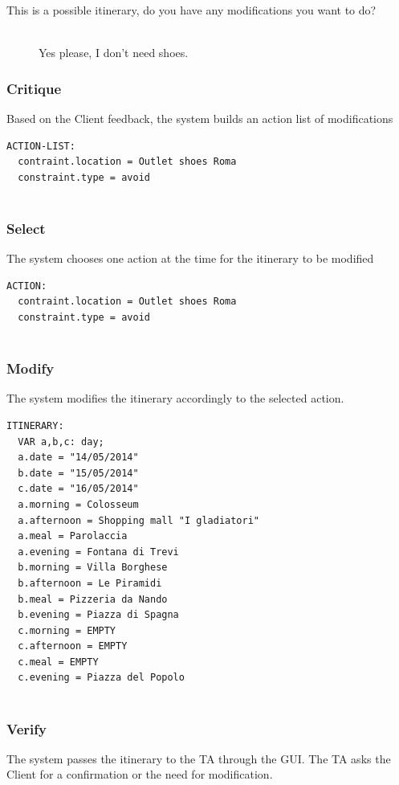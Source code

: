 \documentclass[11pt]{article} %
\begin{document}
\begin{description}
  \item[This is a possible itinerary, do you have any modifications you want to do?] \hfill \\
  Yes please, I don't need shoes.
\end{description}

\subsubsection{Critique}
Based on the Client feedback, the system builds an action list of modifications

\begin{lstlisting}[breaklines=true,mathescape=true]
ACTION-LIST:
  contraint.location = Outlet shoes Roma
  constraint.type = avoid
  
\end{lstlisting}

\subsubsection{Select}
The system chooses one action at the time for the itinerary to be modified

\begin{lstlisting}[breaklines=true,mathescape=true]
ACTION:
  contraint.location = Outlet shoes Roma
  constraint.type = avoid
  
\end{lstlisting}

\subsubsection{Modify}
The system modifies the itinerary accordingly to the selected action.

\begin{lstlisting}[breaklines=true,mathescape=true]
ITINERARY:
  VAR a,b,c: day;
  a.date = "14/05/2014"
  b.date = "15/05/2014"
  c.date = "16/05/2014"
  a.morning = Colosseum
  a.afternoon = Shopping mall "I gladiatori"
  a.meal = Parolaccia
  a.evening = Fontana di Trevi
  b.morning = Villa Borghese
  b.afternoon = Le Piramidi
  b.meal = Pizzeria da Nando
  b.evening = Piazza di Spagna
  c.morning = EMPTY
  c.afternoon = EMPTY 
  c.meal = EMPTY
  c.evening = Piazza del Popolo
  
\end{lstlisting}

\subsubsection{Verify}
The system passes the itinerary to the TA through the GUI. The TA asks the Client for a confirmation or the need for modification.
\end{document}
